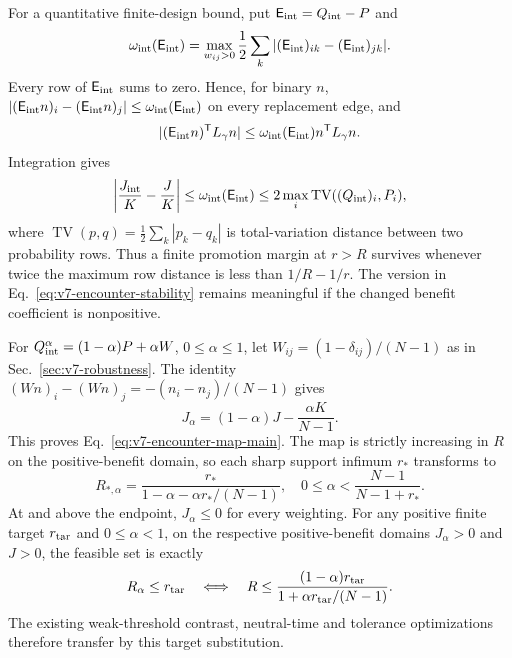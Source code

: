 \documentclass[aps,pre,reprint,amsmath,amssymb,longbibliography]{revtex4-2}
\begin{document}
For a quantitative finite-design bound, put $\mathsf E_{\rm int}=Q_{\rm int}-P$ and
\begin{equation}
 \omega_{\rm int}(\mathsf E_{\rm int})=\max_{w_{ij}>0}\frac12\sum_k|(\mathsf E_{\rm int})_{ik}-(\mathsf E_{\rm int})_{jk}|.
 \label{eq:v7-encounter-oscillation}
\end{equation}
Every row of $\mathsf E_{\rm int}$ sums to zero. Hence, for binary $n$,
$|(\mathsf E_{\rm int} n)_i-(\mathsf E_{\rm int} n)_j|\le\omega_{\rm int}(\mathsf E_{\rm int})$ on every replacement edge, and
\begin{equation}
 |(\mathsf E_{\rm int} n)^{\mathsf T}L_\gamma n|
 \le\omega_{\rm int}(\mathsf E_{\rm int})n^{\mathsf T}L_\gamma n.
 \label{eq:v7-encounter-form-bound}
\end{equation}
Integration gives
\begin{equation}
 \left|\frac{J_{\rm int}}K-\frac JK\right|
 \le\omega_{\rm int}(\mathsf E_{\rm int})
 \le2\max_i\operatorname{TV}((Q_{\rm int})_i,P_i),
 \label{eq:v7-encounter-stability}
\end{equation}
where $\operatorname{TV}(p,q)=\tfrac12\sum_k|p_k-q_k|$ is
total-variation distance between two probability rows. Thus a
finite promotion margin at $r>R$ survives whenever twice the
maximum row distance is less than $1/R-1/r$. The version in
Eq.~\eqref{eq:v7-encounter-stability} remains meaningful if the
changed benefit coefficient is nonpositive.

For $Q_{\rm int}^{\alpha}=(1-\alpha)P+\alpha W$,
$0\le\alpha\le1$, let $W_{ij}=(1-\delta_{ij})/(N-1)$ as in
Sec.~\ref{sec:v7-robustness}. The identity
$(Wn)_i-(Wn)_j=-(n_i-n_j)/(N-1)$ gives
\begin{equation}
 J_\alpha=(1-\alpha)J-\frac{\alpha K}{N-1}.
 \label{eq:v7-encounter-affine}
\end{equation}
This proves Eq.~\eqref{eq:v7-encounter-map-main}. The map is
strictly increasing in $R$ on the positive-benefit domain, so
each sharp support infimum $r_*$ transforms to
\begin{equation}
 R_{*,\alpha}=
 \frac{r_*}{1-\alpha-\alpha r_*/(N-1)},
 \quad 0\le\alpha<\frac{N-1}{N-1+r_*}.
 \label{eq:v7-encounter-infimum}
\end{equation}
At and above the endpoint, $J_\alpha\le0$ for every weighting.
For any positive finite target $r_{\rm tar}$ and $0\le\alpha<1$,
on the respective positive-benefit domains $J_\alpha>0$ and $J>0$,
the feasible set is exactly
\begin{equation}
 R_\alpha\le r_{\rm tar}\quad\Longleftrightarrow\quad
 R\le\frac{(1-\alpha)r_{\rm tar}}
              {1+\alpha r_{\rm tar}/(N-1)}.
 \label{eq:v7-encounter-target-map}
\end{equation}
The existing weak-threshold contrast, neutral-time and tolerance
optimizations therefore transfer by this target substitution.
\end{document}
